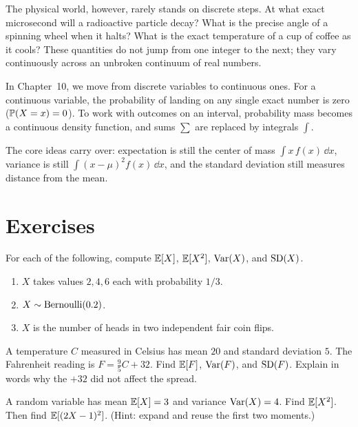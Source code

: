 The physical world, however, rarely stands on discrete steps. At what exact
microsecond will a radioactive particle decay? What is the precise angle of a
spinning wheel when it halts? What is the exact temperature of a cup of coffee
as it cools? These quantities do not jump from one integer to the next; they
vary continuously across an unbroken continuum of real numbers.

In Chapter~10, we move from discrete variables to continuous ones. For a continuous
variable, the probability of landing on any single exact number is zero ($\P(X=x) = 0$).
To work with outcomes on an interval, probability mass becomes a continuous density
function, and sums $\sum$ are replaced by integrals $\int$.

The core ideas carry over: expectation is still the center of mass $\int x\,f(x)\,\dd x$,
variance is still $\int (x-\mu)^2 f(x)\,\dd x$, and the standard deviation still measures
distance from the mean.

\section{Exercises}
\label{ch09:exercises}

\begin{exercise}
\label{ch09:exr-warmup}
For each of the following, compute $\E[X]$, $\E[X^2]$, $\Var(X)$, and
$\SD(X)$.
\begin{enumerate}
  \item $X$ takes values $2, 4, 6$ each with probability $1/3$.
  \item $X \sim \Bern(0.2)$.
  \item $X$ is the number of heads in two independent fair coin flips.
\end{enumerate}
\end{exercise}

\begin{exercise}
\label{ch09:exr-affine}
A temperature $C$ measured in Celsius has mean $20$ and standard deviation
$5$. The Fahrenheit reading is $F = \tfrac{9}{5}C + 32$. Find $\E[F]$,
$\Var(F)$, and $\SD(F)$. Explain in words why the $+32$ did not affect the
spread.
\end{exercise}

\begin{exercise}
\label{ch09:exr-reverse}
A random variable has mean $\E[X] = 3$ and variance $\Var(X) = 4$. Find
$\E[X^2]$. Then find $\E[(2X-1)^2]$. (Hint: expand and reuse the first two
moments.)
\end{exercise}

